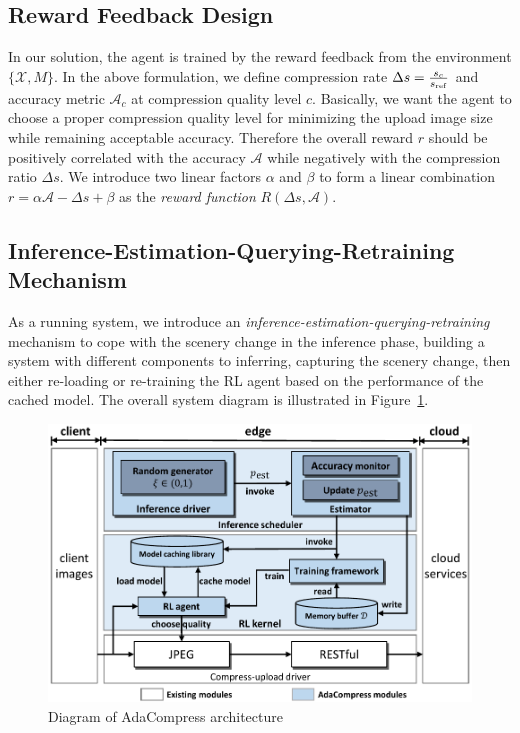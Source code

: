\subsection{Reward Feedback Design}

In our solution, the agent is trained by the reward feedback from the environment $ \{\mathcal{X}, M\} $. In the above formulation, we define compression rate $ \Delta s = \frac{s_c}{s_{\rm ref}} $ and accuracy metric $ \mathcal{A}_c $ at compression quality level $ c $. Basically, we want the agent to choose a proper compression quality level for minimizing the upload image size while remaining acceptable accuracy. \textcolor{revise}{Therefore the overall reward $ r $ should be positively correlated with the accuracy $ \mathcal{A} $ while negatively with the compression ratio $ \Delta s $.} We introduce two linear factors $ \alpha $ and $ \beta $ to form a linear combination $ r = \alpha \mathcal{A} - \Delta s + \beta $ as the \emph{reward function} $ R(\Delta s, \mathcal{A}) $. %

\subsection{Inference-Estimation-Querying-Retraining Mechanism}

As a running system, we introduce an \emph{inference-estimation-querying-retraining} mechanism to cope with the scenery change in the inference phase, building a system with different components to inferring, capturing the scenery change, then either re-loading or re-training the RL agent based on the performance of the cached model. The overall system diagram is illustrated in Figure~\ref{fig: diagram}.


\begin{figure}[!t]
	\centerline{\includegraphics[width=0.8\linewidth]{figures/overall-diagram.pdf}}
	\caption{Diagram of AdaCompress architecture}
	\label{fig: diagram}
\end{figure}

